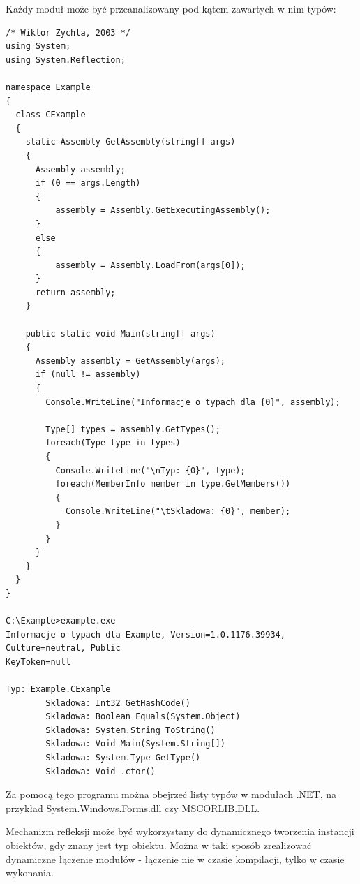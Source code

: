 Każdy moduł może być przeanalizowany pod kątem zawartych w nim typów:

\begin{scriptsize}
\begin{verbatim}
/* Wiktor Zychla, 2003 */
using System;
using System.Reflection;

namespace Example
{	  
  class CExample
  {  	
    static Assembly GetAssembly(string[] args)
    {
      Assembly assembly;
      if (0 == args.Length)
      {
          assembly = Assembly.GetExecutingAssembly();
      }
      else
      {
          assembly = Assembly.LoadFrom(args[0]);
      }
      return assembly;
    }

    public static void Main(string[] args)
    {
      Assembly assembly = GetAssembly(args);
      if (null != assembly)
      {
        Console.WriteLine("Informacje o typach dla {0}", assembly);

        Type[] types = assembly.GetTypes();
        foreach(Type type in types)
        {
          Console.WriteLine("\nTyp: {0}", type);
          foreach(MemberInfo member in type.GetMembers())
          {
            Console.WriteLine("\tSkladowa: {0}", member);
          }
        }
      }      
    }
  }
}

C:\Example>example.exe
Informacje o typach dla Example, Version=1.0.1176.39934, Culture=neutral, Public
KeyToken=null

Typ: Example.CExample
        Skladowa: Int32 GetHashCode()
        Skladowa: Boolean Equals(System.Object)
        Skladowa: System.String ToString()
        Skladowa: Void Main(System.String[])
        Skladowa: System.Type GetType()
        Skladowa: Void .ctor()
\end{verbatim}
\end{scriptsize}

Za pomocą tego programu można obejrzeć listy typów w modułach .NET, na przykład System.Windows.Forms.dll
czy MSCORLIB.DLL.

Mechanizm refleksji może być wykorzystany do dynamicznego tworzenia instancji obiektów, 
gdy znany jest typ obiektu. Można w taki sposób zrealizować dynamiczne łączenie
modułów - łączenie nie w czasie kompilacji, tylko w czasie wykonania.

